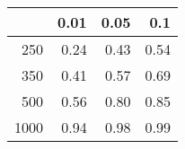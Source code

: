 % 
\begin{tabular}{rrrr}
  \hline
 & 0.01 & 0.05 & 0.1 \\ 
  \hline
250 & 0.24 & 0.43 & 0.54 \\ 
  350 & 0.41 & 0.57 & 0.69 \\ 
  500 & 0.56 & 0.80 & 0.85 \\ 
  1000 & 0.94 & 0.98 & 0.99 \\ 
   \hline
\end{tabular}
